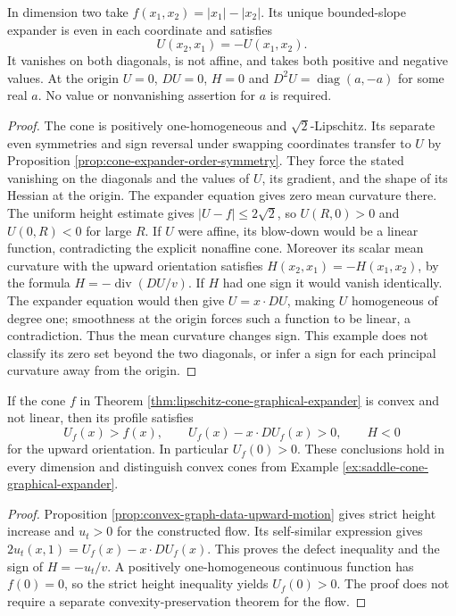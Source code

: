\begin{example}\label{ex:saddle-cone-graphical-expander}
In dimension two take $f(x_1,x_2)=|x_1|-|x_2|$. Its unique bounded-slope expander is even in each coordinate and satisfies
\[
 U(x_2,x_1)=-U(x_1,x_2).
\]
It vanishes on both diagonals, is not affine, and takes both positive and negative values. At the origin $U=0$, $DU=0$, $H=0$ and $D^2U=\operatorname{diag}(a,-a)$ for some real $a$. No value or nonvanishing assertion for $a$ is required.
\end{example}
\begin{proof}
The cone is positively one-homogeneous and $\sqrt2$-Lipschitz. Its separate even symmetries and sign reversal under swapping coordinates transfer to $U$ by Proposition \ref{prop:cone-expander-order-symmetry}. They force the stated vanishing on the diagonals and the values of $U$, its gradient, and the shape of its Hessian at the origin. The expander equation gives zero mean curvature there. The uniform height estimate gives $|U-f|\leq2\sqrt2$, so $U(R,0)>0$ and $U(0,R)<0$ for large $R$. If $U$ were affine, its blow-down would be a linear function, contradicting the explicit nonaffine cone. Moreover its scalar mean curvature with the upward orientation satisfies $H(x_2,x_1)=-H(x_1,x_2)$, by the formula $H=-\operatorname{div}(DU/v)$. If $H$ had one sign it would vanish identically. The expander equation would then give $U=x\cdot DU$, making $U$ homogeneous of degree one; smoothness at the origin forces such a function to be linear, a contradiction. Thus the mean curvature changes sign. This example does not classify its zero set beyond the two diagonals, or infer a sign for each principal curvature away from the origin.
\end{proof}

\begin{corollary}\label{cor:convex-cone-positive-expander-defect}
If the cone $f$ in Theorem \ref{thm:lipschitz-cone-graphical-expander} is convex and not linear, then its profile satisfies
\[
 U_f(x)>f(x),\qquad U_f(x)-x\cdot DU_f(x)>0,\qquad H<0
\]
for the upward orientation. In particular $U_f(0)>0$. These conclusions hold in every dimension and distinguish convex cones from Example \ref{ex:saddle-cone-graphical-expander}.
\end{corollary}
\begin{proof}
Proposition \ref{prop:convex-graph-data-upward-motion} gives strict height increase and $u_t>0$ for the constructed flow. Its self-similar expression gives $2u_t(x,1)=U_f(x)-x\cdot DU_f(x)$. This proves the defect inequality and the sign of $H=-u_t/v$. A positively one-homogeneous continuous function has $f(0)=0$, so the strict height inequality yields $U_f(0)>0$. The proof does not require a separate convexity-preservation theorem for the flow.
\end{proof}
